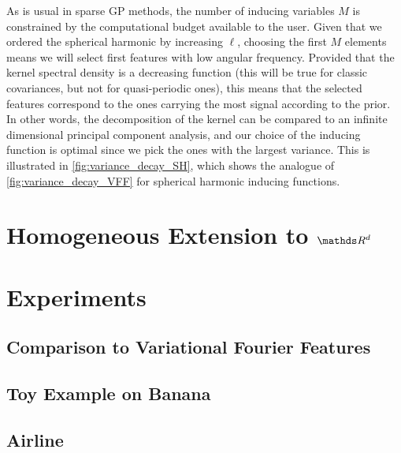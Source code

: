 

As is usual in sparse GP methods, the number of inducing variables $M$ is constrained by the computational budget available to the user. Given that we ordered the spherical harmonic by increasing $\ell$, choosing the first $M$ elements means we will select first features with low angular frequency. Provided that the kernel spectral density is a decreasing function (this will be true for classic covariances, but not for quasi-periodic ones), this means that the selected features correspond to the ones carrying the most signal according to the prior. In other words, the decomposition of the kernel can be compared to an infinite dimensional principal component analysis, and our choice of the inducing function is optimal since we pick the ones with the largest variance. This is illustrated in \cref{fig:variance_decay_SH}, which shows the analogue of \cref{fig:variance_decay_VFF} for spherical harmonic inducing functions.

\section{Homogeneous Extension to $\Reals^d$}


\section{Experiments}

\subsection{Comparison to Variational Fourier Features}

\subsection{Toy Example on Banana}

\subsection{Airline}

